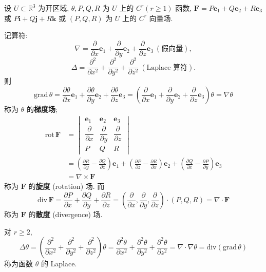 \begin{definition}\label{def:11.6.4}
设 $U\subset\mathbb{R}^{3}$ 为开区域, $\theta,P,Q,R$ 为 $U$ 上的 $C^{r}(r\geqslant1)$ 函数, $\boldsymbol{F}=P\boldsymbol{e}_{1}+Q\boldsymbol{e}_{2}+R\boldsymbol{e}_{3}$ 或 $P\boldsymbol{i}+Q\boldsymbol{j}+R\boldsymbol{k}$ 或 $(P,Q,R)$ 为 $U$ 上的 $C^{r}$ 向量场.

记算符:
\[
\nabla=\frac{\partial}{\partial x}\boldsymbol{e}_{1}+\frac{\partial}{\partial y}\boldsymbol{e}_{2}+\frac{\partial}{\partial z}\boldsymbol{e}_{3}\ (\text{假向量}),
\]
\[
\Delta=\frac{\partial^{2}}{\partial x^{2}}+\frac{\partial^{2}}{\partial y^{2}}+\frac{\partial^{2}}{\partial z^{2}}\ (\text{Laplace 算符}).
\]
则
\[
\mathrm{grad}\,\theta=\frac{\partial\theta}{\partial x}\boldsymbol{e}_{1}+\frac{\partial\theta}{\partial y}\boldsymbol{e}_{2}+\frac{\partial\theta}{\partial z}\boldsymbol{e}_{3}=\left(\frac{\partial}{\partial x}\boldsymbol{e}_{1}+\frac{\partial}{\partial y}\boldsymbol{e}_{2}+\frac{\partial}{\partial z}\boldsymbol{e}_{3}\right)\theta=\nabla\theta
\]
称为 $\theta$ 的\textbf{梯度场};
\[
\begin{aligned}
\mathrm{rot}\,\boldsymbol{F}&=\begin{vmatrix}\boldsymbol{e}_{1}&\boldsymbol{e}_{2}&\boldsymbol{e}_{3}\\ \dfrac{\partial}{\partial x}&\dfrac{\partial}{\partial y}&\dfrac{\partial}{\partial z}\\ P&Q&R\end{vmatrix}\\
&=\left(\frac{\partial R}{\partial y}-\frac{\partial Q}{\partial z}\right)\boldsymbol{e}_{1}+\left(\frac{\partial P}{\partial z}-\frac{\partial R}{\partial x}\right)\boldsymbol{e}_{2}+\left(\frac{\partial Q}{\partial x}-\frac{\partial P}{\partial y}\right)\boldsymbol{e}_{3}\\
&=\nabla\times\boldsymbol{F}
\end{aligned}
\]
称为 $\boldsymbol{F}$ 的\textbf{旋度} (rotation) 场. 而
\[
\mathrm{div}\,\boldsymbol{F}=\frac{\partial P}{\partial x}+\frac{\partial Q}{\partial y}+\frac{\partial R}{\partial z}=\left(\frac{\partial}{\partial x},\frac{\partial}{\partial y},\frac{\partial}{\partial z}\right)\cdot(P,Q,R)=\nabla\cdot\boldsymbol{F}
\]
称为 $\boldsymbol{F}$ 的\textbf{散度} (divergence) 场.

对 $r\geqslant2$,
\[
\Delta\theta=\left(\frac{\partial^{2}}{\partial x^{2}}+\frac{\partial^{2}}{\partial y^{2}}+\frac{\partial^{2}}{\partial z^{2}}\right)\theta=\frac{\partial^{2}\theta}{\partial x^{2}}+\frac{\partial^{2}\theta}{\partial y^{2}}+\frac{\partial^{2}\theta}{\partial z^{2}}=\nabla\cdot\nabla\theta=\mathrm{div}(\mathrm{grad}\,\theta)
\]
称为函数 $\theta$ 的 Laplace.


\end{definition}
